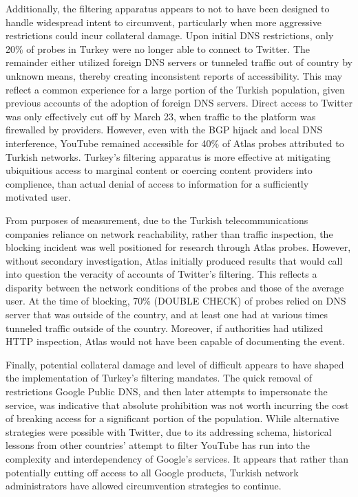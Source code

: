 Additionally, the filtering apparatus appears to not to have been designed to handle widespread intent to circumvent, particularly when more aggressive restrictions could incur collateral damage. Upon initial DNS restrictions, only 20\% of probes in Turkey were no longer able to connect to Twitter. The remainder either utilized foreign DNS servers or tunneled traffic out of country by unknown means, thereby creating inconsistent reports of accessibility. This may reflect a common experience for a large portion of the Turkish population, given previous accounts of the adoption of foreign DNS servers. Direct access to Twitter was only effectively cut off by March 23, when traffic to the platform was firewalled by providers. However, even with the BGP hijack and local DNS interference, YouTube remained accessible for 40\% of Atlas probes attributed to Turkish networks. Turkey's filtering apparatus is more effective at mitigating ubiquitious access to marginal content or coercing content providers into complience, than actual denial of access to information for a sufficiently motivated user.

From purposes of measurement, due to the Turkish telecommunications companies reliance on network reachability, rather than traffic inspection, the blocking incident was well positioned for research through Atlas probes. However, without secondary investigation, Atlas initially produced results that would call into question the veracity of accounts of Twitter's filtering. This reflects a disparity between the network conditions of the probes and those of the average user. At the time of blocking, 70\% (DOUBLE CHECK) of probes relied on DNS server that was outside of the country, and at least one had at various times tunneled traffic outside of the country. Moreover, if authorities had utilized HTTP inspection, Atlas would not have been capable of documenting the event.

Finally, potential collateral damage and level of difficult appears to have shaped the implementation of Turkey's filtering mandates. The quick removal of restrictions Google Public DNS, and then later attempts to impersonate the service, was indicative that absolute prohibition was not worth incurring the cost of breaking access for a significant portion of the population. While alternative strategies were possible with Twitter, due to its addressing schema, historical lessons from other countries' attempt to filter YouTube has run into the complexity and interdependency of Google's services. It appears that rather than potentially cutting off access to all Google products, Turkish network administrators have allowed circumvention strategies to continue.

